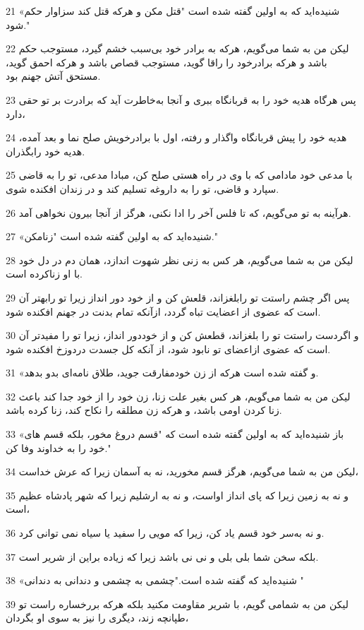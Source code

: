 \par 21 «شنیده‌اید که به اولین گفته شده است "قتل مکن و هر‌که قتل کند سزاوار حکم شود."
\par 22 لیکن من به شما می‌گویم، هر‌که به برادر خود بی‌سبب خشم گیرد، مستوجب حکم باشد و هر‌که برادرخود را راقا گوید، مستوجب قصاص باشد و هرکه احمق گوید، مستحق آتش جهنم بود.
\par 23 پس هرگاه هدیه خود را به قربانگاه ببری و آنجا به‌خاطرت آید که برادرت بر تو حقی دارد،
\par 24 هدیه خود را پیش قربانگاه واگذار و رفته، اول با برادرخویش صلح نما و بعد آمده، هدیه خود رابگذران.
\par 25 با مدعی خود مادامی که با وی در راه هستی صلح کن، مبادا مدعی، تو را به قاضی سپارد و قاضی، تو را به داروغه تسلیم کند و در زندان افکنده شوی.
\par 26 هرآینه به تو می‌گویم، که تا فلس آخر را ادا نکنی، هرگز از آنجا بیرون نخواهی آمد.
\par 27 «شنیده‌اید که به اولین گفته شده است "زنامکن."
\par 28 لیکن من به شما می‌گویم، هر کس به زنی نظر شهوت اندازد، همان دم در دل خود با او زناکرده است.
\par 29 پس اگر چشم راستت تو رابلغزاند، قلعش کن و از خود دور انداز زیرا تو رابهتر آن است که عضوی از اعضایت تباه گردد، ازآنکه تمام بدنت در جهنم افکنده شود.
\par 30 و اگردست راستت تو را بلغزاند، قطعش کن و از خوددور انداز، زیرا تو را مفیدتر آن است که عضوی ازاعضای تو نابود شود، از آنکه کل جسدت دردوزخ افکنده شود.
\par 31 «و گفته شده است هر‌که از زن خودمفارقت جوید، طلاق نامه‌ای بدو بدهد.
\par 32 لیکن من به شما می‌گویم، هر کس بغیر علت زنا، زن خود را از خود جدا کند باعث زنا کردن اومی باشد، و هر‌که زن مطلقه را نکاح کند، زنا کرده باشد.
\par 33 «باز شنیده‌اید که به اولین گفته شده است که "قسم دروغ مخور، بلکه قسم های خود را به خداوند وفا کن."
\par 34 لیکن من به شما می‌گویم، هرگز قسم مخورید، نه به آسمان زیرا که عرش خداست،
\par 35 و نه به زمین زیرا که پای انداز اواست، و نه به ارشلیم زیرا که شهر پادشاه عظیم است،
\par 36 و نه به‌سر خود قسم یاد کن، زیرا که مویی را سفید یا سیاه نمی توانی کرد.
\par 37 بلکه سخن شما بلی بلی و نی نی باشد زیرا که زیاده براین از شریر است.
\par 38 «شنیده‌اید که گفته شده است."چشمی به چشمی و دندانی به دندانی "
\par 39 لیکن من به شمامی گویم، با شریر مقاومت مکنید بلکه هر‌که بررخساره راست تو طپانچه زند، دیگری را نیز به سوی او بگردان،
